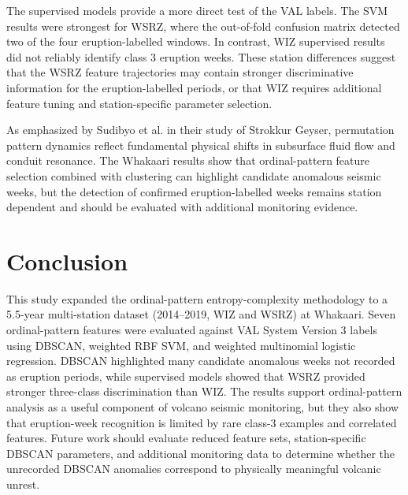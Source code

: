 \documentclass[journal]{IEEEtran}
\begin{document}
The supervised models provide a more direct test of the VAL labels. The SVM results were strongest for WSRZ, where the out-of-fold confusion matrix detected two of the four eruption-labelled windows. In contrast, WIZ supervised results did not reliably identify class 3 eruption weeks. These station differences suggest that the WSRZ feature trajectories may contain stronger discriminative information for the eruption-labelled periods, or that WIZ requires additional feature tuning and station-specific parameter selection.

As emphasized by Sudibyo et al. \cite{sudibyo2022eruption} in their study of Strokkur Geyser, permutation pattern dynamics reflect fundamental physical shifts in subsurface fluid flow and conduit resonance. The Whakaari results show that ordinal-pattern feature selection combined with clustering can highlight candidate anomalous seismic weeks, but the detection of confirmed eruption-labelled weeks remains station dependent and should be evaluated with additional monitoring evidence.

\section{Conclusion}
This study expanded the ordinal-pattern entropy-complexity methodology to a 5.5-year multi-station dataset (2014--2019, WIZ and WSRZ) at Whakaari. Seven ordinal-pattern features were evaluated against VAL System Version 3 labels using DBSCAN, weighted RBF SVM, and weighted multinomial logistic regression. DBSCAN highlighted many candidate anomalous weeks not recorded as eruption periods, while supervised models showed that WSRZ provided stronger three-class discrimination than WIZ. The results support ordinal-pattern analysis as a useful component of volcano seismic monitoring, but they also show that eruption-week recognition is limited by rare class-3 examples and correlated features. Future work should evaluate reduced feature sets, station-specific DBSCAN parameters, and additional monitoring data to determine whether the unrecorded DBSCAN anomalies correspond to physically meaningful volcanic unrest.
\end{document}
